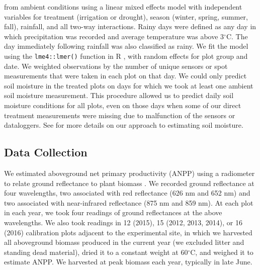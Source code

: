 \documentclass[fleqn,10pt,lineno]{wlpeerj} %
\begin{document}
from ambient conditions using a linear mixed effects model with
independent variables for treatment (irrigation or drought), season
(winter, spring, summer, fall), rainfall, and all two-way interactions.
Rainy days were defined as any day in which precipitation was recorded
and average temperature was above 3\(^{\circ}\)C. The day immediately
following rainfall was also classified as rainy. We fit the model using
the \texttt{lme4::lmer()} function \citep{Bates2015} in R \citep{R2016},
with random effects for plot group and date. We weighted observations by
the number of unique sensors or spot measurements that were taken in
each plot on that day.
We could only predict soil moisture in the treated plots on days for
which we took at least one ambient soil moisture measurement. This
procedure allowed us to predict daily soil moisture conditions for all
plots, even on those days when some of our direct treatment measurements
were missing due to malfunction of the sensors or dataloggers. See
\citet{Kleinhesselink2017b} for more details on our approach to
estimating soil moisture.

\hypertarget{data-collection}{%
\subsection{Data Collection}\label{data-collection}}

We estimated aboveground net primary productivity (ANPP) using a
radiometer to relate ground reflectance to plant biomass \citep[see][
for a review]{Byrne2011}. We recorded ground reflectance at four
wavelengths, two associated with red reflectance (626 nm and 652 nm) and
two associated with near-infrared reflectance (875 nm and 859 nm). At
each plot in each year, we took four readings of ground reflectances at
the above wavelengths. We also took readings in 12 (2015), 15 (2012,
2013, 2014), or 16 (2016) calibration plots adjacent to the experimental
site, in which we harvested all aboveground biomass produced in the
current year (we excluded litter and standing dead material), dried it
to a constant weight at 60\(^{\circ}\)C, and weighed it to estimate
ANPP. We harvested at peak biomass each year, typically in late June.
\end{document}

